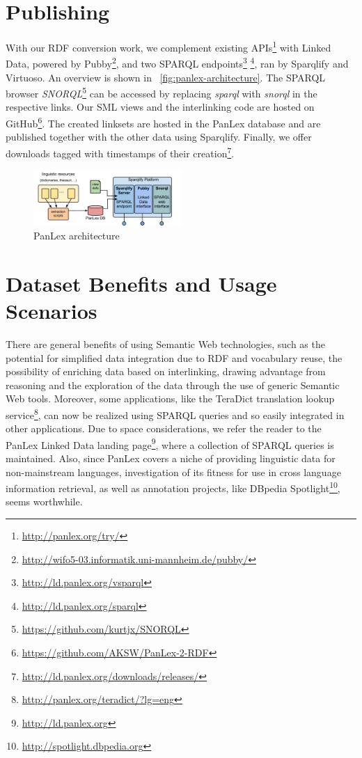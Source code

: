 \documentclass[sw]{iosart2c}
\begin{document}
\section{Publishing}
\label{sec:publishing}
With our RDF conversion work, we complement existing
APIs\footnote{\url{http://panlex.org/try/}} with Linked Data, powered by
Pubby\footnote{\url{http://wifo5-03.informatik.uni-mannheim.de/pubby/}},
and two SPARQL
endpoints\footnote{\url{http://ld.panlex.org/vsparql}}
\footnote{\url{http://ld.panlex.org/sparql}}, ran by Sparqlify and Virtuoso.
An overview is shown in ~\autoref{fig:panlex-architecture}.
The SPARQL browser
\emph{SNORQL}\footnote{\url{https://github.com/kurtjx/SNORQL}} can be accessed
by replacing \emph{sparql} with \emph{snorql} in the respective links. Our SML
views and the interlinking code are hosted on GitHub\footnote{\url{https://github.com/AKSW/PanLex-2-RDF}}.
The created linksets are hosted in the PanLex database and are published together with the other data using Sparqlify.
Finally, we offer downloads tagged with timestamps of their creation\footnote{\url{http://ld.panlex.org/downloads/releases/}}.
\begin{figure}
\centering
\includegraphics[width=0.5\textwidth]{images/pdf/sparqlify_setup02.pdf}
\caption{PanLex architecture}
\label{fig:panlex-architecture}
\end{figure}

\section{Dataset Benefits and Usage Scenarios}
\label{sec:usage}
There are general benefits of using Semantic Web technologies, such as the
potential for simplified data integration due to RDF and vocabulary reuse, the
possibility of enriching data based on interlinking, drawing advantage from
reasoning and the exploration of the data through the use of generic Semantic
Web tools.
Moreover, some applications, like the TeraDict translation lookup
service\footnote{\url{http://panlex.org/teradict/?lg=eng}}, can now be realized
using SPARQL queries and so easily integrated in other applications.
Due to space considerations, we refer the reader to the PanLex Linked Data
landing page\footnote{\url{http://ld.panlex.org}}, where a
collection of SPARQL queries is maintained.
Also, since PanLex covers a niche of providing linguistic data for
non-mainstream languages, investigation of its fitness for use in cross
language information retrieval, as well as annotation projects, like DBpedia
Spotlight\footnote{\url{http://spotlight.dbpedia.org}}, seems worthwhile.
\end{document}
